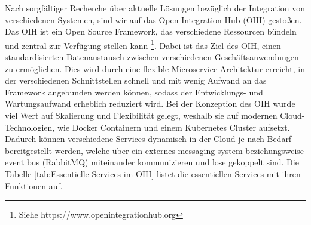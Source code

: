 Nach sorgfältiger Recherche über aktuelle Lösungen bezüglich der Integration von verschiedenen Systemen, sind wir auf das Open Integration Hub (OIH) gestoßen.
Das OIH ist ein Open Source Framework, das verschiedene Ressourcen bündeln und zentral zur Verfügung stellen kann \footnote{Siehe https://www.openintegrationhub.org}. Dabei ist das Ziel des OIH, einen standardisierten Datenaustausch zwischen verschiedenen Geschäftsanwendungen zu ermöglichen. Dies wird durch eine flexible Microservice-Architektur erreicht, in der verschiedenen Schnittstellen schnell und mit wenig Aufwand an das Framework angebunden werden können, sodass der Entwicklungs- und Wartungsaufwand erheblich reduziert wird. Bei der Konzeption des OIH wurde viel Wert auf Skalierung und Flexibilität gelegt, weshalb sie auf modernen Cloud-Technologien, wie Docker Containern und einem Kubernetes Cluster aufsetzt. Dadurch können verschiedene Services dynamisch in der Cloud je nach Bedarf bereitgestellt werden, welche über ein externes messaging system beziehungsweise event bus (RabbitMQ) miteinander kommunizieren und lose gekoppelt sind. Die Tabelle \ref{tab:Essentielle Services im OIH} listet die essentiellen Services mit ihren Funktionen auf.


